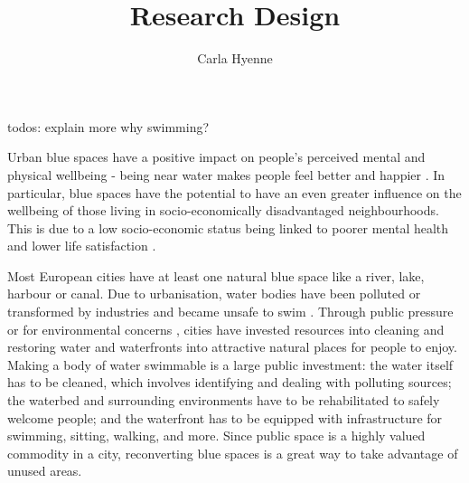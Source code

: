 \documentclass{article}
\title{Research Design}
\author{Carla Hyenne}
\date{}
\begin{document}
\maketitle


todos: explain more why swimming? 

Urban blue spaces have a positive impact on people's perceived mental and physical wellbeing - being near water makes people feel better and happier \parencite{gascon2017outdoor}.
In particular, blue spaces have the potential to have an even greater influence on the wellbeing of those living in socio-economically disadvantaged neighbourhoods. This is due to a low socio-economic status being linked to poorer mental health and lower life satisfaction \parencite{van2021urban}.

Most European cities have at least one natural blue space like a river, lake, harbour or canal. Due to urbanisation, water bodies have been polluted or transformed by industries and became unsafe to swim \parencite{kampa_langaas_anzaldua_2016}. Through public pressure or for environmental concerns \parencite{cite???}, cities have invested resources into cleaning and restoring water and waterfronts into attractive natural places for people to enjoy.
Making a body of water swimmable is a large public investment: the water itself has to be cleaned, which involves identifying and dealing with polluting sources; the waterbed and surrounding environments have to be rehabilitated to safely welcome people; and the waterfront has to be equipped with infrastructure for swimming, sitting, walking, and more.
Since public space is a highly valued commodity in a city, reconverting blue spaces is a great way to take advantage of unused areas.
\end{document}
